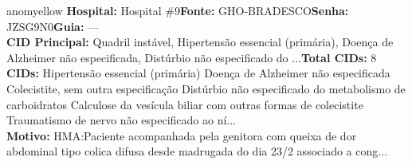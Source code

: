 \documentclass[a4paper,10pt]{article}
\begin{document}
\begin{anomalycard}[Interna\c{c}\~{a}o \#119212 | Pac. \#98863 | MODERADO (z=2.55) | LOS: 5d | 27/02/2026\,$\to$\,04/03/2026]{anomyellow}
\textbf{Hospital:} Hospital \#9\quad \textbf{Fonte:} GHO-BRADESCO\quad \textbf{Senha:} JZSG9N0\quad \textbf{Guia:} ---\\

\textbf{CID Principal:} {\small Quadril instável, Hipertensão essencial (primária), Doença de Alzheimer não especificada, Distúrbio não especificado do ...}\quad\textbf{Total CIDs:} 8\\

\textbf{CIDs:} {\scriptsize Hipertensão essencial (primária) \textbar{} Doença de Alzheimer não especificada \textbar{} Colecistite, sem outra especificação \textbar{} Distúrbio não especificado do metabolismo de carboidratos \textbar{} Calculose da vesícula biliar com outras formas de colecistite \textbar{} Traumatismo de nervo não especificado ao ní...}\\

\textbf{Motivo:} {\scriptsize HMA:Paciente acompanhada pela genitora com queixa de dor abdominal tipo colica difusa desde madrugada do dia 23/2 associado a cong...}\\




\end{anomalycard}
\end{document}
